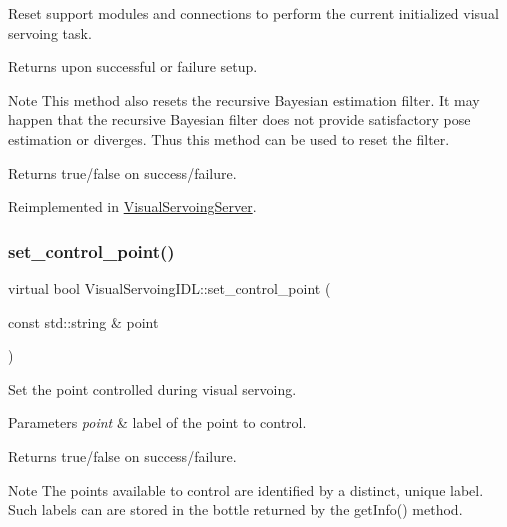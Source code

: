 Reset support modules and connections to perform the current initialized visual servoing task. 

Returns upon successful or failure setup. \begin{DoxyNote}{Note}
This method also resets the recursive Bayesian estimation filter. It may happen that the recursive Bayesian filter does not provide satisfactory pose estimation or diverges. Thus this method can be used to reset the filter. 
\end{DoxyNote}
\begin{DoxyReturn}{Returns}
true/false on success/failure. 
\end{DoxyReturn}


Reimplemented in \hyperlink{classVisualServoingServer_ae397fa9823f425fccf2837122629383f}{Visual\+Servoing\+Server}.

\mbox{\label{classVisualServoingIDL_a9b84b61f0d80d9c931e1947a5e86c761}} 
\subsubsection{\texorpdfstring{set\+\_\+control\+\_\+point()}{set\_control\_point()}}
{\footnotesize\ttfamily virtual bool Visual\+Servoing\+I\+D\+L\+::set\+\_\+control\+\_\+point (\begin{DoxyParamCaption}\item[{const std\+::string \&}]{point }\end{DoxyParamCaption})\hspace{0.3cm}{\ttfamily [virtual]}}



Set the point controlled during visual servoing. 


\begin{DoxyParams}{Parameters}
{\em point} & label of the point to control. \\
\hline
\end{DoxyParams}
\begin{DoxyReturn}{Returns}
true/false on success/failure. 
\end{DoxyReturn}
\begin{DoxyNote}{Note}
The points available to control are identified by a distinct, unique label. Such labels can are stored in the bottle returned by the get\+Info() method. 
\end{DoxyNote}


